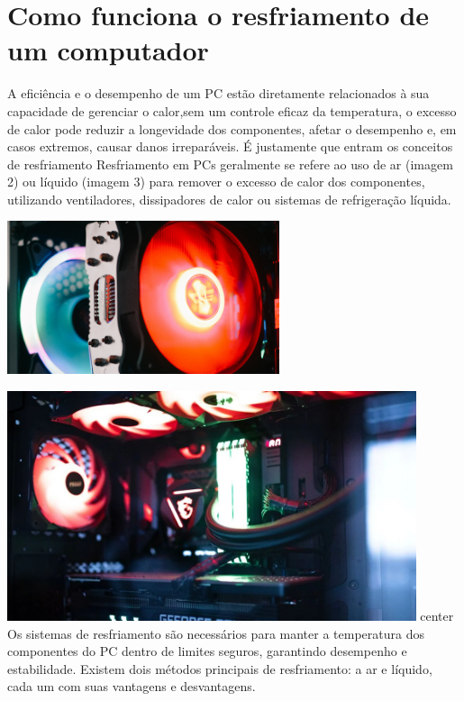 \documentclass[12pt]{article}
\begin{document}
\section{Como funciona o resfriamento de um computador}
A eficiência e o desempenho de um PC estão diretamente relacionados à sua capacidade de gerenciar o calor,sem um controle eficaz da temperatura, o excesso de calor pode reduzir a longevidade dos componentes, afetar o desempenho e, em casos extremos, causar danos irreparáveis. É justamente que entram os conceitos de resfriamento
Resfriamento em PCs geralmente se refere ao uso de ar (imagem 2) ou líquido (imagem 3) para remover o excesso de calor dos componentes, utilizando ventiladores, dissipadores de calor ou sistemas de refrigeração líquida.
\begin{adjustbox}{center,caption={Air Cooler de computador em detalhe},nofloat=figure,vspace=\bigskipamount}
    \includegraphics[width=8cm]{cooler.png}

\end{adjustbox}
\begin{adjustbox}{center,caption={Computador Gamer que utiliza refrigeração liquida},nofloat=figure,vspace=\bigskipamount}
    \includegraphics[width=12cm]{gaymer.png}
\end{adjustbox}{center}
Os sistemas de resfriamento são necessários para manter a temperatura dos componentes do PC dentro de limites seguros, garantindo desempenho e estabilidade. Existem dois métodos principais de resfriamento: a ar e líquido, cada um com suas vantagens e desvantagens.
\end{document}

